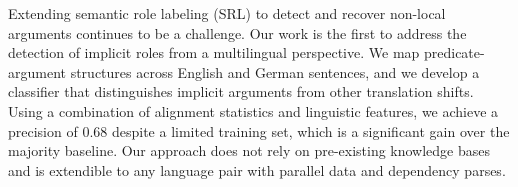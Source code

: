 Extending semantic role labeling (SRL) to detect and recover non-local arguments continues to be a challenge. Our work is the first to address the detection of implicit roles from a multilingual perspective. We map predicate-argument structures across English and German sentences, and we develop a classifier that distinguishes implicit arguments from other translation shifts. Using a combination of alignment statistics and linguistic features, we achieve a precision of 0.68 despite a limited training set, which is a significant gain over the majority baseline. Our approach does not rely on pre-existing knowledge bases and is extendible to any language pair with parallel data and dependency parses.
